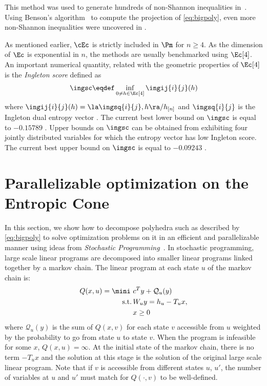 \documentclass[12pt]{article}
\begin{document}
This method was used to generate hundreds of non-Shannon inequalities in~\cite{dougherty2011non}.
Using Benson's algorithm~\cite{benson1998outer} to compute the projection of \eqref{eq:bigpoly}, even more non-Shannon inequalities were uncovered in \cite{csirmaz2016using, lohne2015vector}.

As mentioned earlier, $\cEc$ is strictly included in $\Pm$ for $n \geq 4$.
As the dimension of $\Ec$ is exponential in $n$,
the methods are usually benchmarked using $\Ec[4]$.
An important numerical quantity, related with the geometric properties of $\Ec[4]$ is the \emph{Ingleton score} defined as
\[ \ingsc \eqdef \inf_{0 \neq h \in \Ec[4]} \ingij{i}{j}(h) \]
where $\ingij{i}{j}(h) = \la \ingsq{i}{j}, h \ra / h_{[n]}$ \cite[Definition~3]{dougherty2011non} and $\ingsq{i}{j}$ is the Ingleton dual entropy vector \cite{ingleton1971conditions}.
The current best lower bound on $\ingsc$ is equal to $-0.15789$ \cite{dougherty2011non}.
Upper bounds on $\ingsc$ can be obtained from exhibiting four jointly distributed variables for which the entropy vector has low Ingleton score.
The current best upper bound on $\ingsc$ is equal to $-0.09243$ \cite{matus2013entropy}.

\section{Parallelizable optimization on the Entropic Cone}
\label{sec:sddp}
In this section, we show how to decompose polyhedra such as described by \eqref{eq:bigpoly} to solve optimization problems on it
in an efficient and parallelizable manner using ideas from \emph{Stochastic Programming}~\cite{birge2011introduction}.
In stochastic programming, large scale linear programs are decomposed into smaller linear programs linked together by a markov chain.
The linear program at each state $u$ of the markov chain is:
\begin{align*}
  Q(x, u) = \mini\,\, & c^T y + \mathcal{Q}_u(y)\\
  \text{s.t.} \,& W_u y = h_u - T_ux,\\
              & x \geq 0
\end{align*}
where $\mathcal{Q}_u(y)$ is the sum of $Q(x, v)$ for each state $v$ accessible from $u$
weighted by the probability to go from state $u$ to state $v$.
When the program is infeasible for some $x$, $Q(x, u) = \infty$.
At the initial state of the markov chain, there is no term $-T_ux$ and
the solution at this stage is the solution of the original large scale linear program.
Note that if $v$ is accessible from different states $u$, $u'$, the number of variables at $u$ and $u'$ must match for $Q(\cdot, v)$ to be well-defined.
\end{document}
